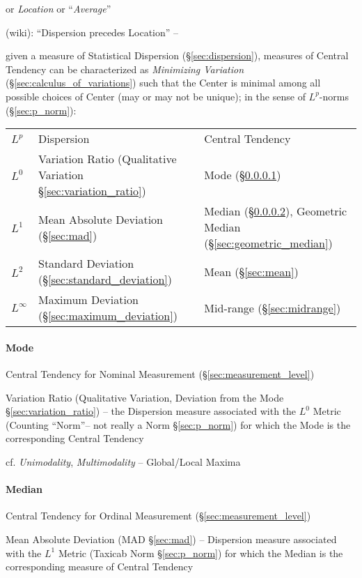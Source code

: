 or \emph{Location} or ``\emph{Average}''

(wiki): ``Dispersion precedes Location'' --

given a measure of Statistical Dispersion (\S\ref{sec:dispersion}), measures of
Central Tendency can be characterized as \emph{Minimizing Variation}
(\S\ref{sec:calculus_of_variations}) such that the Center is minimal among all
possible choices of Center (may or may not be unique); in the sense of
$L^p$-norms (\S\ref{sec:p_norm}):
\begin{tabular}{l l l}
  $L^p$ & Dispersion & Central Tendency \\
  $L^0$ & Variation Ratio (Qualitative Variation \S\ref{sec:variation_ratio})
    & Mode (\S\ref{sec:mode}) \\
  $L^1$ & Mean Absolute Deviation (\S\ref{sec:mad})
    & Median (\S\ref{sec:median}),
      Geometric Median (\S\ref{sec:geometric_median}) \\
  $L^2$ & Standard Deviation (\S\ref{sec:standard_deviation})
    & Mean (\S\ref{sec:mean}) \\
  $L^\infty$ & Maximum Deviation (\S\ref{sec:maximum_deviation})
    & Mid-range (\S\ref{sec:midrange})
\end{tabular}



\paragraph{Mode}\label{sec:mode}\hfill

Central Tendency for Nominal Measurement (\S\ref{sec:measurement_level})

\fist Variation Ratio (Qualitative Variation, Deviation from the Mode
\S\ref{sec:variation_ratio}) -- the Dispersion measure associated with the $L^0$
Metric (Counting ``Norm''-- not really a Norm \S\ref{sec:p_norm}) for which the
Mode is the corresponding Central Tendency

cf. \emph{Unimodality}, \emph{Multimodality} -- Global/Local Maxima



\paragraph{Median}\label{sec:median}\hfill

Central Tendency for Ordinal Measurement (\S\ref{sec:measurement_level})

\fist Mean Absolute Deviation (MAD \S\ref{sec:mad}) -- Dispersion measure
associated with the $L^1$ Metric (Taxicab Norm \S\ref{sec:p_norm}) for which the
Median is the corresponding measure of Central Tendency

